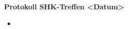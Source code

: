 \documentclass[11pt,a4paper]{article}
\begin{document}
\begin{center}

\textbf{\huge Protokoll SHK-Treffen <Datum>}\\[0.9cm]

\end{center}

\begin{itemize}
  \item 
\end{itemize}
\end{document}
